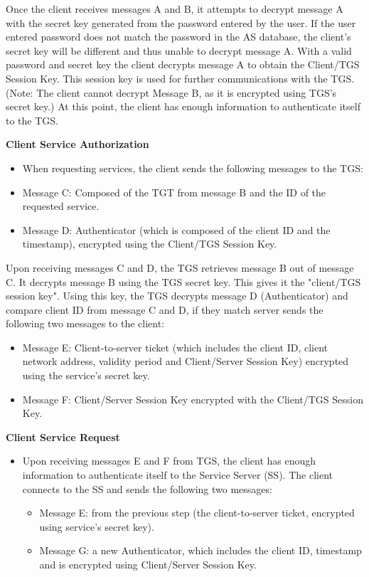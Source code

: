 \documentclass[11pt]{article}
\begin{document}
Once the client receives messages A and B, it attempts to decrypt message A with the secret key generated from the password entered by the user. If the user entered password does not match the password in the AS database, the client's secret key will be different and thus unable to decrypt message A. With a valid password and secret key the client decrypts message A to obtain the Client/TGS Session Key. This session key is used for further communications with the TGS. (Note: The client cannot decrypt Message B, as it is encrypted using TGS's secret key.) At this point, the client has enough information to authenticate itself to the TGS.

\textbf{Client Service Authorization}
\begin{itemize}
\item When requesting services, the client sends the following messages to the TGS:
\item Message C: Composed of the TGT from message B and the ID of the requested service.
\item Message D: Authenticator (which is composed of the client ID and the timestamp), encrypted using the Client/TGS Session Key.
\end{itemize}

Upon receiving messages C and D, the TGS retrieves message B out of message C. It decrypts message B using the TGS secret key. This gives it the "client/TGS session key". Using this key, the TGS decrypts message D (Authenticator) and compare client ID from message C and D, if they match server sends the following two messages to the client:
\begin{itemize}
\item Message E: Client-to-server ticket (which includes the client ID, client network address, validity period and Client/Server Session Key) encrypted using the service's secret key.
\item Message F: Client/Server Session Key encrypted with the Client/TGS Session Key.
\end{itemize}

\textbf{Client Service Request}
\begin{itemize}
\item Upon receiving messages E and F from TGS, the client has enough information to authenticate itself to the Service Server (SS). The client connects to the SS and sends the following two messages:
\begin{itemize}
\item Message E: from the previous step (the client-to-server ticket, encrypted using service's secret key).
\item Message G: a new Authenticator, which includes the client ID, timestamp and is encrypted using Client/Server Session Key.
\end{itemize}
\end{itemize}
\end{document}
